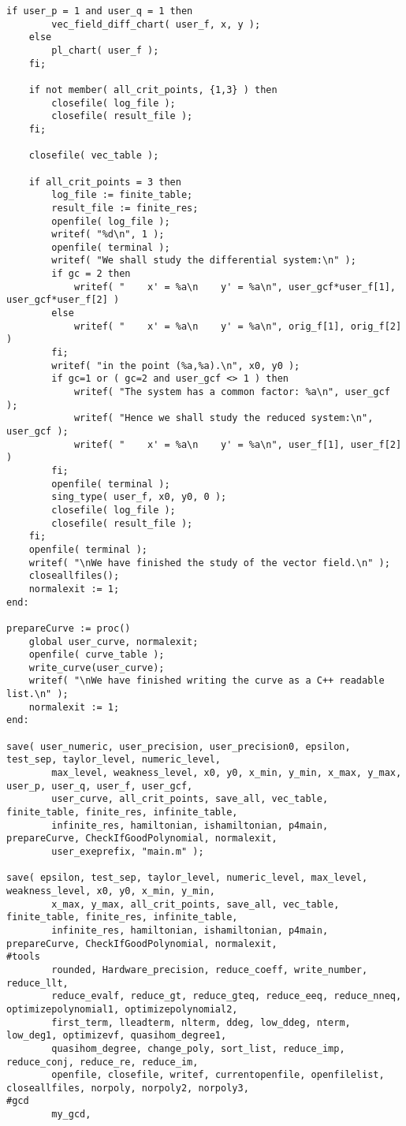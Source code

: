 \documentclass[a4paper,10pt]{article}
\begin{document}
\begin{lstlisting}[name=main]
    if user_p = 1 and user_q = 1 then
        vec_field_diff_chart( user_f, x, y );
    else
        pl_chart( user_f );
    fi;

    if not member( all_crit_points, {1,3} ) then
        closefile( log_file );
        closefile( result_file );
    fi;

    closefile( vec_table );

    if all_crit_points = 3 then
        log_file := finite_table;
        result_file := finite_res;
        openfile( log_file );
        writef( "%d\n", 1 );
        openfile( terminal );
        writef( "We shall study the differential system:\n" );
        if gc = 2 then
            writef( "    x' = %a\n    y' = %a\n", user_gcf*user_f[1], user_gcf*user_f[2] )
        else
            writef( "    x' = %a\n    y' = %a\n", orig_f[1], orig_f[2] )
        fi;
        writef( "in the point (%a,%a).\n", x0, y0 );
        if gc=1 or ( gc=2 and user_gcf <> 1 ) then
            writef( "The system has a common factor: %a\n", user_gcf );
            writef( "Hence we shall study the reduced system:\n", user_gcf );
            writef( "    x' = %a\n    y' = %a\n", user_f[1], user_f[2] )
        fi;
        openfile( terminal );
        sing_type( user_f, x0, y0, 0 );
        closefile( log_file );
        closefile( result_file );
    fi;
    openfile( terminal );
    writef( "\nWe have finished the study of the vector field.\n" );
    closeallfiles();
    normalexit := 1;
end:

prepareCurve := proc()
    global user_curve, normalexit;
    openfile( curve_table );
    write_curve(user_curve);
    writef( "\nWe have finished writing the curve as a C++ readable list.\n" );    
    normalexit := 1;
end:

save( user_numeric, user_precision, user_precision0, epsilon, test_sep, taylor_level, numeric_level,
        max_level, weakness_level, x0, y0, x_min, y_min, x_max, y_max, user_p, user_q, user_f, user_gcf, 
        user_curve, all_crit_points, save_all, vec_table, finite_table, finite_res, infinite_table,
        infinite_res, hamiltonian, ishamiltonian, p4main, prepareCurve, CheckIfGoodPolynomial, normalexit, 
        user_exeprefix, "main.m" );

save( epsilon, test_sep, taylor_level, numeric_level, max_level, weakness_level, x0, y0, x_min, y_min, 
        x_max, y_max, all_crit_points, save_all, vec_table, finite_table, finite_res, infinite_table, 
        infinite_res, hamiltonian, ishamiltonian, p4main, prepareCurve, CheckIfGoodPolynomial, normalexit,
#tools
        rounded, Hardware_precision, reduce_coeff, write_number, reduce_llt,
        reduce_evalf, reduce_gt, reduce_gteq, reduce_eeq, reduce_nneq, optimizepolynomial1, optimizepolynomial2,
        first_term, lleadterm, nlterm, ddeg, low_ddeg, nterm, low_deg1, optimizevf, quasihom_degree1,
        quasihom_degree, change_poly, sort_list, reduce_imp, reduce_conj, reduce_re, reduce_im,
        openfile, closefile, writef, currentopenfile, openfilelist, closeallfiles, norpoly, norpoly2, norpoly3,
#gcd
        my_gcd,


\end{lstlisting}
\end{document}
